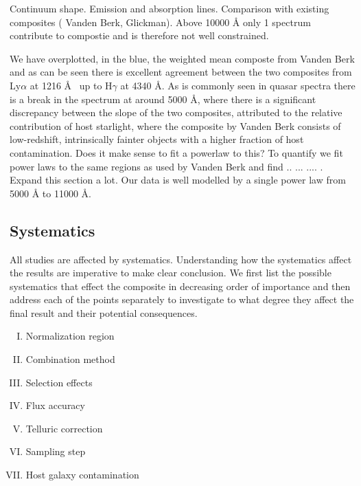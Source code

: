 \documentclass{aa}    %
\newcommand{\sectlabel}[1]{\label{sect:#1}}
\begin{document}
Continuum shape. Emission and absorption lines. Comparison with existing composites ( Vanden Berk, Glickman). Above 10000 \r{A} only 1 spectrum contribute to compostie and is therefore not well constrained. 


 We have overplotted, in the blue, the weighted mean composte from Vanden Berk and as can be seen there is excellent agreement between the two composites from Ly$\alpha$ at 1216 \AA~ up to H$\gamma$ at 4340 \AA. As is commonly seen in quasar spectra there is a break in the spectrum at around 5000 \r{A}, where there is a significant discrepancy between the slope of the two composites, attributed to the relative contribution of host starlight, where the composite by Vanden Berk consists of low-redshift, intrinsically fainter objects with a higher fraction of host contamination. Does it make sense to fit a powerlaw to this? To quantify we fit power laws to the same regions as used by Vanden Berk and find .. ... .... . Expand this section a lot. Our data is well modelled by a single power law from 5000 \r{A} to 11000 \r{A}. 
 












\subsection{Systematics}  \sectlabel{systematics}

All studies are affected by systematics. Understanding how the systematics affect the results are imperative to make clear conclusion. We first list the possible systematics that effect the composite in decreasing order of importance and then address each of the points separately to investigate to what degree they affect the final result and their potential consequences.


\begin{enumerate}[(I)]
	\item Normalization region
	\item Combination method
	\item Selection effects
	\item Flux accuracy
	\item Telluric correction
	\item Sampling step
	\item Host galaxy contamination
\end{enumerate}
\end{document}

